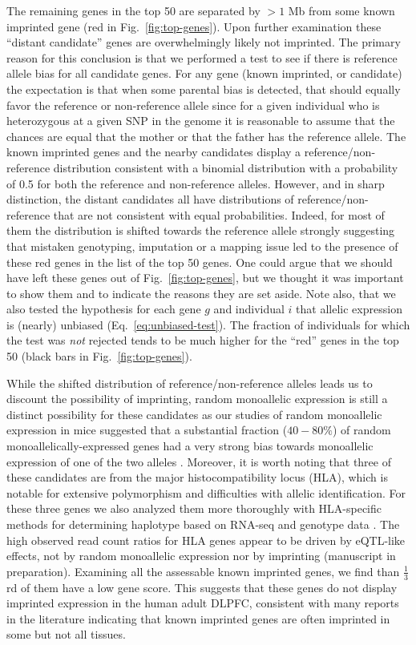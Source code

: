 \documentclass[letterpaper]{article}
\begin{document}
The remaining genes in the top 50 are separated by \(>1\) Mb from some known imprinted
gene (red in Fig.~\ref{fig:top-genes}).  Upon further
examination these ``distant candidate'' genes are overwhelmingly likely not imprinted. The primary reason for
this conclusion is that we performed a test to see if there is reference
allele bias for all candidate genes. For any gene (known imprinted, or
candidate) the expectation is that when some parental bias is detected, that
should equally favor the reference or non-reference allele since for a given
individual who is heterozygous at a given SNP in the genome it is reasonable
to assume that the chances are equal that the mother or that the father has
the reference allele. The known imprinted genes and the nearby candidates
display a reference/non-reference distribution
consistent with a binomial distribution with a probability of 0.5 for both the
reference and non-reference alleles.  However, and in sharp distinction, the
distant candidates all have
distributions of reference/non-reference that are not consistent with equal
probabilities.  Indeed, for most of them the distribution is shifted towards the
reference allele strongly suggesting that mistaken genotyping, imputation or a
mapping issue led to the presence of these red genes in the list of the top 50
genes. One could argue that we should have left these genes out of
Fig.~\ref{fig:top-genes}, but we thought it was important to show them and to
indicate the reasons they are set aside.   Note also, that we also tested the
hypothesis for each gene \(g\) and individual \(i\) that allelic expression is
(nearly) unbiased (Eq.~\ref{eq:unbiased-test}).  The fraction of individuals
for which the test was \emph{not} rejected tends to be much higher for the
``red'' genes in the top 50 (black bars in Fig.~\ref{fig:top-genes}).

While the shifted distribution of reference/non-reference alleles leads us to
discount the possibility of imprinting, random monoallelic expression is still
a distinct possibility for these candidates as our studies of random
monoallelic expression in mice suggested that a substantial fraction
(\(40-80\%\)) of random monoallelically-expressed genes had a very strong bias
towards monoallelic expression of one of the two alleles \cite{Zwemer2012}.
Moreover, it is worth noting that three of these candidates are from the major
histocompatibility locus (HLA), which is notable for extensive polymorphism
and difficulties with allelic identification. For these three genes we also
analyzed them more thoroughly with HLA-specific methods for determining
haplotype based on RNA-seq \cite{Bai2014a} and genotype data \cite{Zheng2014}.
The high observed read count ratios for HLA genes appear to be driven by
eQTL-like effects, not by random monoallelic expression nor by imprinting
(manuscript in preparation).  Examining all the assessable known imprinted
genes, we find than \(\frac{1}{3}\)rd of them have a low gene score. This
suggests that these genes do not display imprinted expression in the human
adult DLPFC, consistent with many reports in the literature indicating that
known imprinted genes are often imprinted in some but not all tissues.  
\end{document}
